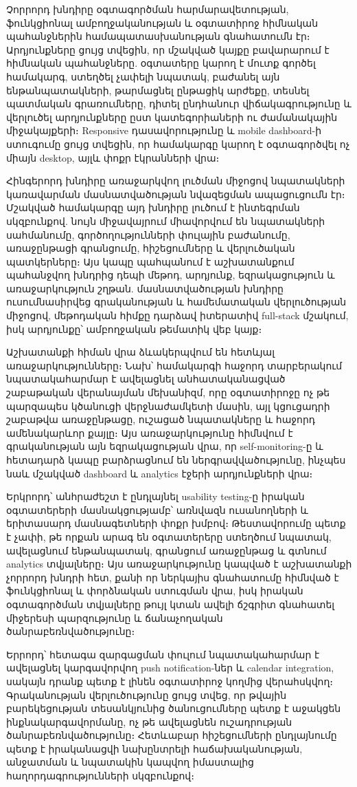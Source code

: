 Չորրորդ խնդիրը օգտագործման հարմարավետության, ֆունկցիոնալ ամբողջականության և օգտատիրոջ հիմնական պահանջներին համապատասխանության գնահատումն էր։ Արդյունքները ցույց տվեցին, որ մշակված կայքը բավարարում է հիմնական պահանջները. օգտատերը կարող է մուտք գործել համակարգ, ստեղծել չափելի նպատակ, բաժանել այն ենթանպատակների, թարմացնել ընթացիկ արժեքը, տեսնել պատմական գրառումները, դիտել ընդհանուր վիճակագրությունը և վերլուծել արդյունքները ըստ կատեգորիաների ու ժամանակային միջակայքերի։ Responsive դասավորությունը և mobile dashboard-ի ստուգումը ցույց տվեցին, որ համակարգը կարող է օգտագործվել ոչ միայն desktop, այլև փոքր էկրանների վրա։

Հինգերորդ խնդիրը առաջարկվող լուծման միջոցով նպատակների կառավարման մասնատվածության նվազեցման ապացուցումն էր։ Մշակված համակարգը այդ խնդիրը լուծում է ինտեգրման սկզբունքով. նույն միջավայրում միավորվում են նպատակների սահմանումը, գործողությունների փուլային բաժանումը, առաջընթացի գրանցումը, հիշեցումները և վերլուծական պատկերները։ Այս կապը պահպանում է աշխատանքում պահանջվող խնդրից դեպի մեթոդ, արդյունք, եզրակացություն և առաջարկություն շղթան. մասնատվածության խնդիրը ուսումնասիրվեց գրականության և համեմատական վերլուծության միջոցով, մեթոդական հիմքը դարձավ իտերատիվ full-stack մշակում, իսկ արդյունքը՝ ամբողջական թեմատիկ վեբ կայք։

Աշխատանքի հիման վրա ձևակերպվում են հետևյալ առաջարկությունները։ Նախ՝ համակարգի հաջորդ տարբերակում նպատակահարմար է ավելացնել անհատականացված շաբաթական վերանայման մեխանիզմ, որը օգտատիրոջը ոչ թե պարզապես կծանուցի վերջնաժամկետի մասին, այլ կցուցադրի շաբաթվա առաջընթացը, ուշացած նպատակները և հաջորդ ամենակարևոր քայլը։ Այս առաջարկությունը հիմնվում է գրականության այն եզրակացության վրա, որ self-monitoring-ը և հետադարձ կապը բարձրացնում են ներգրավվածությունը, ինչպես նաև մշակված dashboard և analytics էջերի արդյունքների վրա։

Երկրորդ՝ անհրաժեշտ է ընդլայնել usability testing-ը իրական օգտատերերի մասնակցությամբ՝ առնվազն ուսանողների և երիտասարդ մասնագետների փոքր խմբով։ Թեստավորումը պետք է չափի, թե որքան արագ են օգտատերերը ստեղծում նպատակ, ավելացնում ենթանպատակ, գրանցում առաջընթաց և գտնում analytics տվյալները։ Այս առաջարկությունը կապված է աշխատանքի չորրորդ խնդրի հետ, քանի որ ներկայիս գնահատումը հիմնված է ֆունկցիոնալ և փորձնական ստուգման վրա, իսկ իրական օգտագործման տվյալները թույլ կտան ավելի ճշգրիտ գնահատել միջերեսի պարզությունը և ճանաչողական ծանրաբեռնվածությունը։

Երրորդ՝ հետագա զարգացման փուլում նպատակահարմար է ավելացնել կարգավորվող push notification-ներ և calendar integration, սակայն դրանք պետք է լինեն օգտատիրոջ կողմից վերահսկվող։ Գրականության վերլուծությունը ցույց տվեց, որ թվային բարեկեցության տեսանկյունից ծանուցումները պետք է աջակցեն ինքնակարգավորմանը, ոչ թե ավելացնեն ուշադրության ծանրաբեռնվածությունը։ Հետևաբար հիշեցումների ընդլայնումը պետք է իրականացվի նախընտրելի հաճախականության, անջատման և նպատակին կապվող իմաստալից հաղորդագրությունների սկզբունքով։


